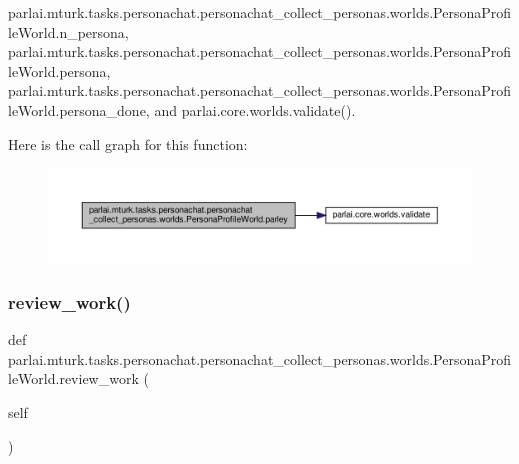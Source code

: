 parlai.\+mturk.\+tasks.\+personachat.\+personachat\+\_\+collect\+\_\+personas.\+worlds.\+Persona\+Profile\+World.\+n\+\_\+persona, parlai.\+mturk.\+tasks.\+personachat.\+personachat\+\_\+collect\+\_\+personas.\+worlds.\+Persona\+Profile\+World.\+persona, parlai.\+mturk.\+tasks.\+personachat.\+personachat\+\_\+collect\+\_\+personas.\+worlds.\+Persona\+Profile\+World.\+persona\+\_\+done, and parlai.\+core.\+worlds.\+validate().

Here is the call graph for this function\+:
\nopagebreak
\begin{figure}[H]
\begin{center}
\leavevmode
\includegraphics[width=350pt]{classparlai_1_1mturk_1_1tasks_1_1personachat_1_1personachat__collect__personas_1_1worlds_1_1PersonaProfileWorld_a8b22a981d91b85ea180cfe293200fe4d_cgraph}
\end{center}
\end{figure}
\mbox{\label{classparlai_1_1mturk_1_1tasks_1_1personachat_1_1personachat__collect__personas_1_1worlds_1_1PersonaProfileWorld_ad8c659c3d53a2b21877f4d16e6f33a1e}} 
\subsubsection{\texorpdfstring{review\+\_\+work()}{review\_work()}}
{\footnotesize\ttfamily def parlai.\+mturk.\+tasks.\+personachat.\+personachat\+\_\+collect\+\_\+personas.\+worlds.\+Persona\+Profile\+World.\+review\+\_\+work (\begin{DoxyParamCaption}\item[{}]{self }\end{DoxyParamCaption})}




